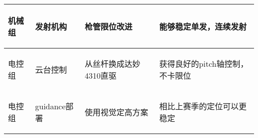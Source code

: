 \begin{longtable}{ p{1.5cm} | p{3cm} | p{6cm} | p{4.3cm} |}
    \hline

        \begin{center}
            机械组
        \end{center}&
        \begin{center}
            发射机构
        \end{center}&
        \begin{center}
            枪管限位改进
        \end{center}&
        \begin{center}
            能够稳定单发，连续发射
        \end{center}\\
        
    \hline
    
        \begin{center}
            电控组
        \end{center} &
        \begin{center}
            云台控制
        \end{center} &
        \begin{center}
            从丝杆换成达妙4310直驱
        \end{center} &
        \begin{center}
            获得良好的pitch轴控制，不卡限位
        \end{center} \\

    \hline
    
        \begin{center}
            电控组
        \end{center} &
        \begin{center}
            guidance部署
        \end{center} &
        \begin{center}
            使用视觉定高方案
        \end{center} &
        \begin{center}
            相比上赛季的定位可以更稳定
        \end{center} \\

    \hline


\end{longtable}
